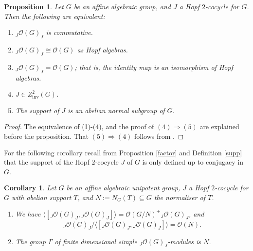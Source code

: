 \documentclass{amsart}
\numberwithin{equation}{section}
\newtheorem{proposition}[theorem]{Proposition}
\newtheorem{corollary}[theorem]{Corollary}
\theoremstyle{definition}
\begin{document}
\begin{proposition}\label{nochange} Let $G$ be an affine algebraic group, and $J$ a Hopf $2$-cocycle for $G$. Then the following are equivalent:
\begin{enumerate}
\item ${}_J\mathcal{O}(G)_J$ is commutative.
\item ${}_J\mathcal{O}(G)_J \cong \mathcal{O}(G)$ as Hopf algebras.
\item ${}_J\mathcal{O}(G)_J = \mathcal{O}(G)$; that is, the identity map is an isomorphism of Hopf algebras.
\item $J \in Z^2_{\mathrm{inv}}(G)$.
\item The support of $J$ is an abelian normal subgroup of $G$.
\end{enumerate}
\end{proposition}

\begin{proof} The equivalence of (1)-(4), and the proof of $(4)\Rightarrow (5)$ are explained before the proposition. That $(5)\Rightarrow (4)$ follows from \cite[Theorem 6.1 and the first three lines of its proof]{EG4}.
\end{proof}

For the following corollary recall from Proposition \ref{factor} and Definition \ref{supp} that the support of the Hopf $2$-cocycle $J$ of $G$ is only defined up to conjugacy in $G$.

\begin{corollary}\label{abeliansupp} 
Let $G$ be an affine algebraic unipotent group, $J$ a Hopf $2$-cocycle for $G$ with abelian support $T$, and $N:=N_G(T)\subseteq G$ the normaliser of $T$.
\begin{enumerate}
\item 
We have $ \langle [ {}_J\mathcal{O}(G)_J, {}_J\mathcal{O}(G)_J] \rangle =  \mathcal{O}(G/N)^+{}_J\mathcal{O}(G)_J$, 
and $${}_J\mathcal{O}(G)_J/\langle [ {}_J\mathcal{O}(G)_J, {}_J\mathcal{O}(G)_J] \rangle = \mathcal{O}(N).$$
\item 
The group $\Gamma$ of finite dimensional simple ${}_J\mathcal{O}(G)_J$-modules is $N$. 
\end{enumerate} 
\end{corollary}
\end{document}

